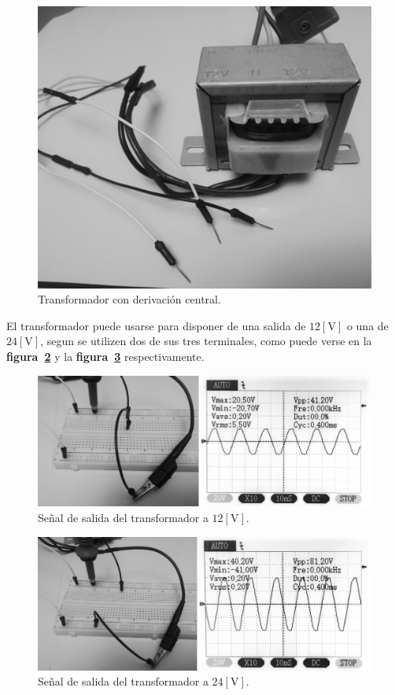 \begin{figure}[!h]
\centering
\includegraphics[scale=0.28]{fotos/01.transformador1.eps}
\caption{Transformador con derivación central.}
\label{laboratorio01}
\end{figure}

El transformador puede usarse para disponer de una salida de $12[\text{V}]$ o
una de $24[\text{V}]$, segun se utilizen dos de sus tres terminales, como puede
verse en la \textbf{figura~\ref{laboratorio02}} y la
\textbf{figura~\ref{laboratorio03}} respectivamente.

\begin{figure}[!h]
\centering
\includegraphics[scale=0.28]{fotos/01.transformador2.eps}
\caption{Señal de salida del transformador a $12[\text{V}]$.}
\label{laboratorio02}
\end{figure}

\begin{figure}[!h]
\centering
\includegraphics[scale=0.28]{fotos/01.transformador3.eps}
\caption{Señal de salida del transformador a $24[\text{V}]$.}
\label{laboratorio03}
\end{figure}

